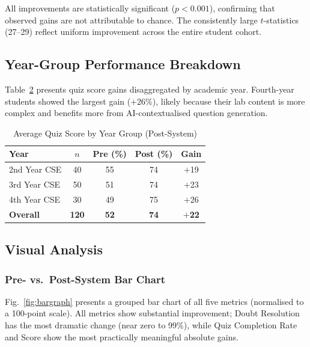 \documentclass[conference]{IEEEtran}
\begin{document}
\begin{table}[h]
All improvements are statistically significant ($p < 0.001$), confirming that observed gains are not attributable to chance. The consistently large $t$-statistics (27--29) reflect uniform improvement across the entire student cohort.

\subsection{Year-Group Performance Breakdown}

Table~\ref{tab:yeargroup} presents quiz score gains disaggregated by academic year. Fourth-year students showed the largest gain ($+$26\%), likely because their lab content is more complex and benefits more from AI-contextualised question generation.

\begin{table}[h]
\caption{Average Quiz Score by Year Group (Post-System)}
\label{tab:yeargroup}
\centering
\renewcommand{\arraystretch}{1.3}
\begin{tabular}{|l|c|c|c|c|}
\hline
\textbf{Year} & \textbf{$n$} & \textbf{Pre (\%)} & \textbf{Post (\%)} & \textbf{Gain} \\
\hline
2nd Year CSE & 40 & 55 & 74 & $+$19 \\
\hline
3rd Year CSE & 50 & 51 & 74 & $+$23 \\
\hline
4th Year CSE & 30 & 49 & 75 & $+$26 \\
\hline
\textbf{Overall} & \textbf{120} & \textbf{52} & \textbf{74} & \textbf{$+$22} \\
\hline
\end{tabular}
\end{table}

\subsection{Visual Analysis}

\subsubsection{Pre- vs.\ Post-System Bar Chart}

Fig.~\ref{fig:bargraph} presents a grouped bar chart of all five metrics (normalised to a 100-point scale). All metrics show substantial improvement; Doubt Resolution has the most dramatic change (near zero to 99\%), while Quiz Completion Rate and Score show the most practically meaningful absolute gains.


\end{table}
\end{document}
